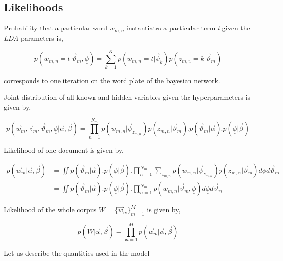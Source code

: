 \subsection{Likelihoods}

Probability that a particular word \(w_{m,n}\) instantiates a particular term \(t\) given the \textit{LDA} parameters is,

\begin{equation}\label{eqn:likelihood}
 p(w_{m,n}=t|\vec{\vartheta}_m,\underline{\phi}) = \sum_{k=1}^{K} p(w_{m,n}=t|\vec{\psi}_k)p(z_{m,n}=k|\vec{\vartheta}_m)
\end{equation}

 corresponds to one iteration on the word plate of the bayesian network.

Joint distribution of all known and hidden variables given the hyperparameters is given by,

\begin{equation}
p(\vec{w}_m,\vec{z}_m,\vec{\vartheta}_m,\underline{\phi}|\vec{\alpha},\vec{\beta}) = 
\prod_{n=1}^{N_m} p(w_{m,n}|\vec{\psi}_{z_{m,n}})p(z_{m,n}|\vec{\vartheta}_m).p(\vec{\vartheta}_m|\vec{\alpha}).p(\underline{\phi}|\vec{\beta})
\end{equation}

Likelihood of one document is given by,

\begin{align}
p(\vec{w}_m|\vec{\alpha},\vec{\beta})		& = \iint p(\vec{\vartheta}_m|\vec{\alpha}).p(\underline{\phi}|\vec{\beta}).\prod_{n=1}^{N_m} \sum_{z_{m,n}} p(w_{m,n}|\vec{\psi}_{z_{m,n}})p(z_{m,n}|\vec{\vartheta}_m)d\underline{\phi}d\vec{\vartheta}_m \\                                  
						& = \iint p(\vec{\vartheta}_m|\vec{\alpha}).p(\underline{\phi}|\vec{\beta}).\prod_{n=1}^{N_m} p(w_{m,n}|\vec{\vartheta}_m,\underline{\phi}) d\underline{\phi}d\vec{\vartheta}_m
\end{align}

Likelihood of the whole corpus \(W = \{\vec{w}_m\}_{m=1}^{M}\) is given by,

\begin{equation}
p(W|\vec{\alpha},\vec{\beta}) = \prod_{m=1}^{M} p(\vec{w}_m|\vec{\alpha},\vec{\beta})
\end{equation}

Let us describe the quantities used in the model

